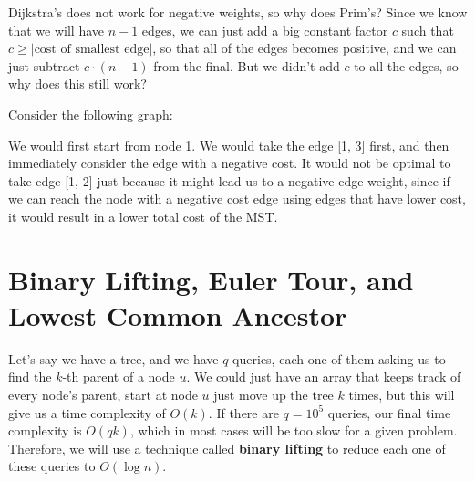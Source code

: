 \documentclass{article}
\begin{document}
Dijkstra's does not work for negative weights, so why does Prim's? Since we know that we will have $n - 1$ edges, we can just add a big constant factor $c$ such that $c \geq \lvert \text{cost of smallest edge} \rvert$, so that all of the edges becomes positive, and we can just subtract $c \cdot (n - 1)$ from the final. But we didn't add $c$ to all the edges, so why does this still work?

Consider the following graph:
\begin{center}
 \end{center}
 
 We would first start from node 1. We would take the edge [1, 3] first, and then immediately consider the edge with a negative cost. It would not be optimal to take edge [1, 2] just because it might lead us to a negative edge weight, since if we can reach the node with a negative cost edge using edges that have lower cost, it would result in a lower total cost of the MST.
 
\section{Binary Lifting, Euler Tour, and Lowest Common Ancestor}
Let's say we have a tree, and we have $q$ queries, each one of them asking us to find the $k$-th parent of a node $u$. We could just have an array that keeps track of every node's parent, start at node $u$ just move up the tree $k$ times, but this will give us a time complexity of $O(k)$. If there are $q = 10^5$ queries, our final time complexity is $O(qk)$, which in most cases will be too slow for a given problem. Therefore, we will use a technique called \textbf{binary lifting} to reduce each one of these queries to $O(\log n)$.
\end{document}
